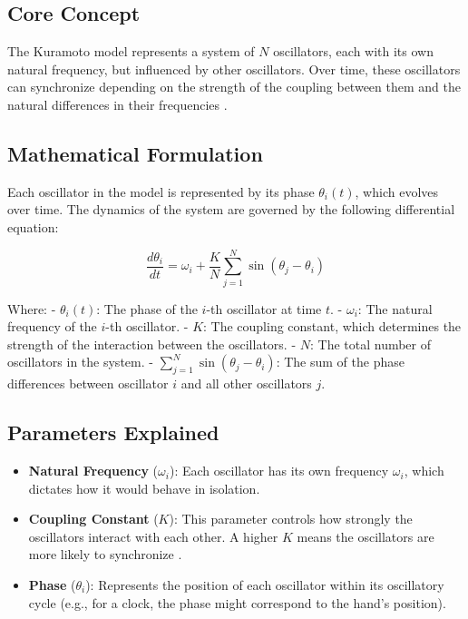 \documentclass{article}
\begin{document}
\subsection*{Core Concept}

The Kuramoto model represents a system of $N$ oscillators, each with its own natural frequency, but influenced by other oscillators. Over time, these oscillators can synchronize depending on the strength of the coupling between them and the natural differences in their frequencies \cite{oster1973auditory}.

\subsection*{Mathematical Formulation}

Each oscillator in the model is represented by its phase $\theta_i(t)$, which evolves over time. The dynamics of the system are governed by the following differential equation:

\[
\frac{d\theta_i}{dt} = \omega_i + \frac{K}{N} \sum_{j=1}^{N} \sin(\theta_j - \theta_i)
\]

Where:
- $\theta_i(t)$: The phase of the $i$-th oscillator at time $t$.
- $\omega_i$: The natural frequency of the $i$-th oscillator.
- $K$: The coupling constant, which determines the strength of the interaction between the oscillators.
- $N$: The total number of oscillators in the system.
- $\sum_{j=1}^{N} \sin(\theta_j - \theta_i)$: The sum of the phase differences between oscillator $i$ and all other oscillators $j$.

\subsection*{Parameters Explained}
\begin{itemize}
    \item \textbf{Natural Frequency} ($\omega_i$): Each oscillator has its own frequency $\omega_i$, which dictates how it would behave in isolation.
    \item \textbf{Coupling Constant} ($K$): This parameter controls how strongly the oscillators interact with each other. A higher $K$ means the oscillators are more likely to synchronize \cite{draganova2008cortical, gao2014analysis}.
    \item \textbf{Phase} ($\theta_i$): Represents the position of each oscillator within its oscillatory cycle (e.g., for a clock, the phase might correspond to the hand's position).
\end{itemize}
\end{document}
